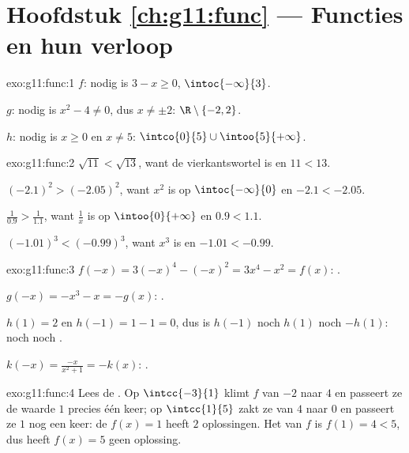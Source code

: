 \section*{Hoofdstuk \ref{ch:g11:func} --- Functies en hun verloop}

\begin{solution}{exo:g11:func:1}
$f$: nodig is $3 - x \geq 0$,  $\intoc{-\infty}{3}$.

$g$: nodig is $x^2 - 4 \neq 0$, dus $x \neq \pm 2$: 
$\R \setminus \{-2, 2\}$.

$h$: nodig is $x \geq 0$ en $x \neq 5$: 
$\intco{0}{5} \cup \intoo{5}{+\infty}$.
\end{solution}

\begin{solution}{exo:g11:func:2}
$\sqrt{11} < \sqrt{13}$, want de vierkantswortel is  en
$11 < 13$.

$(-2.1)^2 > (-2.05)^2$, want $x^2$ is  op $\intoc{-\infty}{0}$ en
$-2.1 < -2.05$.

$\frac{1}{0.9} > \frac{1}{1.1}$, want $\frac1x$ is  op
$\intoo{0}{+\infty}$ en $0.9 < 1.1$.

$(-1.01)^3 < (-0.99)^3$, want $x^3$ is  en $-1.01 < -0.99$.
\end{solution}

\begin{solution}{exo:g11:func:3}
$f(-x) = 3(-x)^4 - (-x)^2 = 3x^4 - x^2 = f(x)$: .

$g(-x) = -x^3 - x = -g(x)$: .

$h(1) = 2$ en $h(-1) = 1 - 1 = 0$, dus is $h(-1)$ noch $h(1)$ noch
$-h(1)$: noch  noch .

$k(-x) = \frac{-x}{x^2+1} = -k(x)$: .
\end{solution}

\begin{solution}{exo:g11:func:4}
Lees de . Op $\intcc{-3}{1}$ klimt $f$ van $-2$ naar $4$ en
passeert ze de waarde $1$ precies één keer; op $\intcc{1}{5}$ zakt ze van
$4$ naar $0$ en passeert ze $1$ nog een keer: de  $f(x) = 1$
heeft $2$ oplossingen. Het  van $f$ is $f(1) = 4 < 5$, dus heeft
$f(x) = 5$ geen oplossing.
\end{solution}

